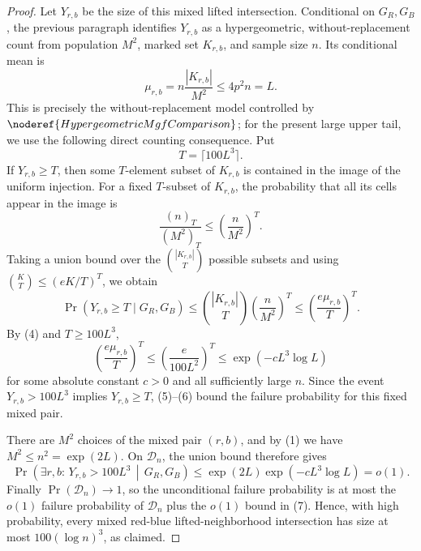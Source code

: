 \begin{proof}
Let \(Y_{r,b}\) be the size of this mixed lifted intersection.  Conditional
on \(G_R,G_B\), the previous paragraph identifies \(Y_{r,b}\) as a
hypergeometric, without-replacement count from population \(M^2\), marked
set \(K_{r,b}\), and sample size \(n\).  Its conditional mean is
\[
\mu_{r,b}=n\frac{|K_{r,b}|}{M^2}\le 4p^2n=L.
\tag{4}
\]
This is precisely the without-replacement model controlled by
\(\noderef{HypergeometricMgfComparison}\); for the present large upper tail,
we use the following direct counting consequence.  Put
\[
T=\lceil 100L^3\rceil.
\]
If \(Y_{r,b}\ge T\), then some \(T\)-element subset of \(K_{r,b}\) is
contained in the image of the uniform injection.  For a fixed \(T\)-subset
of \(K_{r,b}\), the probability that all its cells appear in the image is
\[
\frac{(n)_T}{(M^2)_T}\le\left(\frac n{M^2}\right)^T.
\]
Taking a union bound over the \(\binom{|K_{r,b}|}{T}\) possible subsets and
using \(\binom{K}{T}\le(eK/T)^T\), we obtain
\[
\Pr(Y_{r,b}\ge T\mid G_R,G_B)
\le
\binom{|K_{r,b}|}{T}\left(\frac n{M^2}\right)^T
\le
\left(\frac{e\mu_{r,b}}{T}\right)^T.
\tag{5}
\]
By (4) and \(T\ge100L^3\),
\[
\left(\frac{e\mu_{r,b}}{T}\right)^T
\le
\left(\frac{e}{100L^2}\right)^T
\le \exp(-cL^3\log L)
\tag{6}
\]
for some absolute constant \(c>0\) and all sufficiently large \(n\).  Since
the event \(Y_{r,b}>100L^3\) implies \(Y_{r,b}\ge T\), (5)--(6) bound the
failure probability for this fixed mixed pair.

There are \(M^2\) choices of the mixed pair \((r,b)\), and by (1) we have
\(M^2\le n^2=\exp(2L)\).  On \(\mathcal D_n\), the union bound therefore
gives
\[
\Pr\!\left(\exists r,b:\,
Y_{r,b}>100L^3 \,\middle|\, G_R,G_B\right)
\le
\exp(2L)\exp(-cL^3\log L)=o(1).
\tag{7}
\]
Finally \(\Pr(\mathcal D_n)\to1\), so the unconditional failure probability
is at most the \(o(1)\) failure probability of \(\mathcal D_n\) plus the
\(o(1)\) bound in (7).  Hence, with high probability, every mixed red-blue
lifted-neighborhood intersection has size at most \(100(\log n)^3\), as
claimed.
\end{proof}
